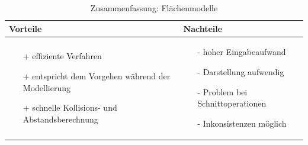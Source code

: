 \begin{table}[hbt]
\centering
\begin{tabular}{|p{6.5cm}|p{6.5cm}|}
\hline
Vorteile & Nachteile\\
\hline
\vspace{-5mm}
\begin{itemize}
\setlength\itemsep{0em}
\item[+] effiziente Verfahren 
\item[+] entspricht dem Vorgehen während der Modellierung
\item[+] schnelle Kollisions- und Abstandsberechnung
\end{itemize}
 &
 \vspace{-5mm}
\begin{itemize}
\setlength\itemsep{0em}
\item[-] hoher Eingabeaufwand
\item[-] Darstellung aufwendig
\item[-] Problem bei Schnittoperationen
\item[-] Inkonsistenzen möglich
\end{itemize}\\
\hline
\end{tabular}
\caption{Zusammenfassung: Flächenmodelle}
\label{tab:Flaechenmod}
\end{table}\\ 

